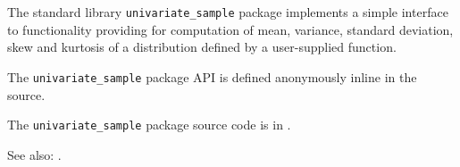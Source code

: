 
The standard library {\tt univariate\_sample} package implements a simple interface to 
functionality providing for computation of  
mean, variance, standard deviation, skew and kurtosis of a distribution defined by 
a user-supplied function.

The {\tt univariate\_sample} package API is defined anonymously inline in the source.

The {\tt univariate\_sample} package source code is in .

See also:  .




